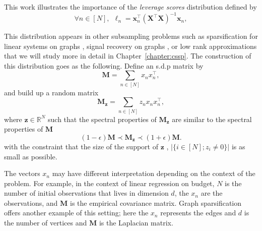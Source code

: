 \documentclass[twoside,11pt]{book}
\numberwithin{theorem}{chapter}
\numberwithin{definition}{chapter}
\numberwithin{proposition}{chapter}
\numberwithin{corollary}{chapter}
\numberwithin{example}{chapter}
\numberwithin{lemma}{chapter}
\numberwithin{assumption}{chapter}
\DeclareMathOperator{\Tran}{\intercal}
\begin{document}
This work illustrates the importance of the \emph{leverage scores} distribution defined by
\begin{equation}
\forall n \in [N], \:\: \ell_{n} = \bm{x}_{n}^{\Tran} (\bm{X}^{\Tran} \bm{X})^{-1} \bm{x}_{n},
\end{equation}

This distribution appears in other subsampling problems such as sparsification for linear systems on graphs \citep*{SpTe04,SpSr11}, signal recovery on graphs \citep*{PuTrGrVa18}, or low rank approximations \citep*{DrMaMu07} that we will study more in detail in Chapter~\ref{chapter:cssp}.
The construction of this distribution goes as the following. Define an s.d.p matrix by
\begin{equation}
\bm{M} = \sum\limits_{n \in [N]} x_{n}x_{n}^{\Tran},
\end{equation}
and build up a random matrix 
\begin{equation}
\bm{M}_{\bm{z}} = \sum\limits_{n \in [N]} z_{n} x_{n}x_{n}^{\Tran},
\end{equation}
where $\bm{z} \in \mathbb{R}^{N}$ such that the spectral properties of $\bm{M}_{\bm{z}}$ are similar to the spectral properties of $\bm{M}$
\begin{equation}\label{eq:matrix_similarity_condition_}
(1-\epsilon) \bm{M} \prec \bm{M}_{\bm{z}} \prec (1+\epsilon) \bm{M}.
\end{equation}
with the constraint that the size of the support of $\bm{z}$ , $|\{ i \in [N]; z_{i} \neq 0 \}|$ is as small as possible. 


The vectors $x_{n}$ may have different interpretation depending on the context of the problem. For example, in the context of linear regression on budget, $N$ is the number of initial observations that lives in dimension $d$, the $x_{n}$ are the observations, and $\bm{M}$ is the empirical covariance matrix. Graph sparsification offers another example of this setting; here the $x_{n}$ represents the edges and $d$ is the number of vertices and $\bm{M}$ is the Laplacian matrix.
\end{document}
